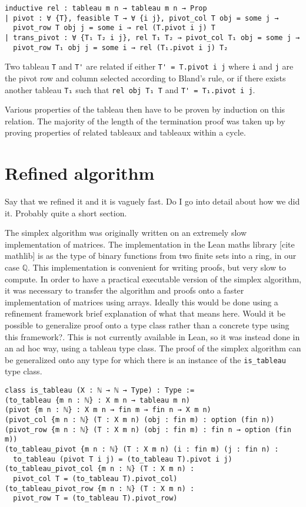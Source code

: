 \documentclass[11pt]{article} %
\begin{document}
\begin{lstlisting}
inductive rel : tableau m n → tableau m n → Prop
| pivot : ∀ {T}, feasible T → ∀ {i j}, pivot_col T obj = some j →
  pivot_row T obj j = some i → rel (T.pivot i j) T
| trans_pivot : ∀ {T₁ T₂ i j}, rel T₁ T₂ → pivot_col T₁ obj = some j →
  pivot_row T₁ obj j = some i → rel (T₁.pivot i j) T₂
\end{lstlisting}

Two tableau \lstinline|T| and \lstinline|T'| are related if either \lstinline|T' = T.pivot i j| where \lstinline|i| and \lstinline|j| are the pivot row and column selected according to Bland's rule, or if there exists another tableau \lstinline|T₁| such that \lstinline|rel obj T₁ T| and \lstinline|T' = T₁.pivot i j|.

Various properties of the tableau then have to be proven by induction on this relation. The majority of the length of the termination proof was taken up by proving properties of related tableaux and tableaux within a cycle.

\section{Refined algorithm}
\color{red} Say that we refined it and it is vaguely fast. Do I go into detail about how we did it. Probably quite a short section. \color{black}

The simplex algorithm was originally written on an extremely slow implementation of matrices. The implementation in the Lean maths library \color{red}[cite mathlib]\color{black} is as the type of binary functions from two finite sets into a ring, in our case $\mathbb{Q}$. This implementation is convenient for writing proofs, but very slow to compute. In order to have a practical executable version of the simplex algorithm, it was necessary to transfer the algorithm and proofs onto a faster implementation of matrices using arrays. Ideally this would be done using a refinement framework \color{red} brief explanation of what that means here. Would it be possible to generalize proof onto a type class rather than a concrete type using this framework?\color{black}. This is not currently available in Lean, so it was instead done in an ad hoc way, using a tableau type class. The proof of the simplex algorithm can be generalized onto any type for which there is an instance of the \lstinline|is_tableau| type class.

\begin{lstlisting}
class is_tableau (X : ℕ → ℕ → Type) : Type :=
(to_tableau {m n : ℕ} : X m n → tableau m n)
(pivot {m n : ℕ} : X m n → fin m → fin n → X m n)
(pivot_col {m n : ℕ} (T : X m n) (obj : fin m) : option (fin n))
(pivot_row {m n : ℕ} (T : X m n) (obj : fin m) : fin n → option (fin m))
(to_tableau_pivot {m n : ℕ} (T : X m n) (i : fin m) (j : fin n) :
  to_tableau (pivot T i j) = (to_tableau T).pivot i j)
(to_tableau_pivot_col {m n : ℕ} (T : X m n) :
  pivot_col T = (to_tableau T).pivot_col)
(to_tableau_pivot_row {m n : ℕ} (T : X m n) :
  pivot_row T = (to_tableau T).pivot_row)
\end{lstlisting}
\end{document}
